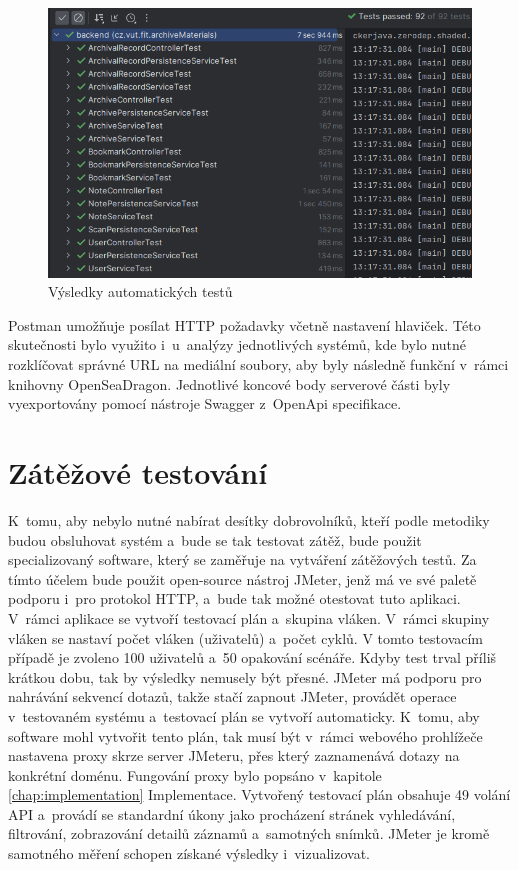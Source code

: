 \begin{figure}[htbp]
    \centering
        \includegraphics[scale=.6]{obrazky-figures/testing/backendTestResult.png}
        \caption{Výsledky automatických testů}
\end{figure}

\noindent
Postman umožňuje posílat HTTP požadavky včetně nastavení hlaviček. Této skutečnosti bylo využito i~u~analýzy jednotlivých systémů, kde bylo nutné rozklíčovat správné URL na mediální soubory, aby byly následně funkční v~rámci knihovny OpenSeaDragon. Jednotlivé koncové body serverové části byly vyexportovány pomocí nástroje Swagger z~OpenApi specifikace.

\section{Zátěžové testování}
 K~tomu, aby nebylo nutné nabírat desítky dobrovolníků, kteří podle metodiky budou obsluhovat systém a~bude se tak testovat zátěž, bude použit specializovaný software, který se zaměřuje na vytváření zátěžových testů. Za tímto účelem bude použit open-source nástroj JMeter, jenž má ve své paletě podporu i~pro protokol HTTP, a~bude tak možné otestovat tuto aplikaci. 
\newpara
V~rámci aplikace se vytvoří testovací plán a~skupina vláken. V~rámci skupiny vláken se nastaví počet vláken (uživatelů) a~počet cyklů. V tomto testovacím případě je zvoleno 100 uživatelů a~50 opakování scénáře. Kdyby test trval příliš krátkou dobu, tak by výsledky nemusely být přesné. 
\newpara
JMeter má podporu pro nahrávání sekvencí dotazů, takže stačí zapnout JMeter, provádět operace v~testovaném systému a~testovací plán se vytvoří automaticky. K~tomu, aby software mohl vytvořit tento plán, tak musí být v~rámci webového prohlížeče nastavena proxy skrze server JMeteru, přes který zaznamenává dotazy na konkrétní doménu. Fungování proxy bylo popsáno v~kapitole \ref{chap:implementation} Implementace. Vytvořený testovací plán obsahuje 49 volání API a~provádí se standardní úkony jako procházení stránek vyhledávání, filtrování, zobrazování detailů záznamů a~samotných snímků. JMeter je kromě samotného měření schopen získané výsledky i~vizualizovat.

